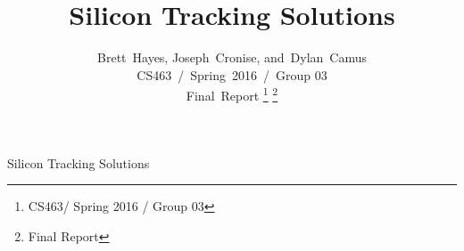 \documentclass[10pt, onecolumn, twoside, peerreview]{IEEEtran}
\begin{document}
%
\title{Silicon Tracking Solutions}
%
%
%

\author{Brett~Hayes,
        Joseph~Cronise,
        and~Dylan~Camus\\%
        CS463~/~Spring~2016~/~Group 03\\%
        Final~Report
\thanks{CS463/ Spring 2016 / Group 03}%
\thanks{Final Report}}


% 
%



%
{Silicon Tracking Solutions}%
% 
\end{document}
